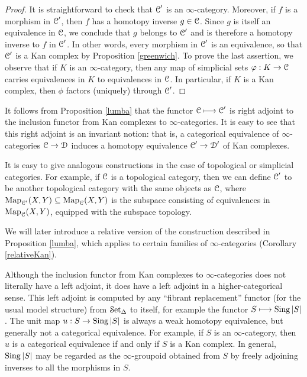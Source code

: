 \begin{Didn't Read}
\begin{proof}
It is straightforward to check that $\operatorname{\mathcal{C}}'$ is an $\infty$-category. Moreover, if
$f$ is a morphism in $\operatorname{\mathcal{C}}'$, then $f$ has a homotopy inverse $g \in \operatorname{\mathcal{C}}$. Since
$g$ is itself an equivalence in $\operatorname{\mathcal{C}}$, we conclude that $g$ belongs to $\operatorname{\mathcal{C}}'$ and
is therefore a homotopy inverse to $f$ in $\operatorname{\mathcal{C}}'$. In other words, every morphism in $\operatorname{\mathcal{C}}'$ is an equivalence, so that $\operatorname{\mathcal{C}}'$ is a Kan complex by Proposition \ref{greenwich}. To prove the last assertion, we observe that if $K$ is an $\infty$-category, then any map of simplicial sets
$\varphi: K \rightarrow \operatorname{\mathcal{C}}$ carries equivalences in $K$ to equivalences in $\operatorname{\mathcal{C}}$. In particular, if
$K$ is a Kan complex, then $\phi$ factors (uniquely) through $\operatorname{\mathcal{C}}'$.
\end{proof}

It follows from Proposition \ref{lumba} that the functor
$\operatorname{\mathcal{C}} \longmapsto \operatorname{\mathcal{C}}'$ is right adjoint to
the inclusion functor from Kan complexes to $\infty$-categories. It is easy to see that this right adjoint is an invariant notion: that is, a categorical equivalence of $\infty$-categories $\operatorname{\mathcal{C}} \rightarrow \operatorname{\mathcal{D}}$ induces a homotopy equivalence
$\operatorname{\mathcal{C}}' \rightarrow \operatorname{\mathcal{D}}'$ of Kan complexes. 

\begin{remark}
It is easy to give analogous constructions in the case of topological or simplicial categories. For example, if $\operatorname{\mathcal{C}}$ is a topological category, then we can define $\operatorname{\mathcal{C}}'$ to be another topological category with the same objects as $\operatorname{\mathcal{C}}$, where $\operatorname{{Map}}_{\operatorname{\mathcal{C}}'}(X,Y) \subseteq \operatorname{{Map}}_{\operatorname{\mathcal{C}}}(X,Y)$ is the subspace consisting of equivalences in $\operatorname{{Map}}_{\operatorname{\mathcal{C}}}(X,Y)$, equipped with the subspace topology.
\end{remark}

\begin{remark}
We will later introduce a relative version of the construction described in Proposition \ref{lumba}, which applies to certain families of $\infty$-categories (Corollary \ref{relativeKan}).
\end{remark}

Although the inclusion functor from Kan complexes to $\infty$-categories does not
literally have a left adjoint, it does have a left adjoint in a higher-categorical sense. This left adjoint is computed by any ``fibrant replacement'' functor (for the usual model structure) from $\operatorname{\mathcal{S}et_{\Delta}}$ to itself, for
example the functor $S \longmapsto \operatorname{Sing} |S|$.
The unit map $u: S \rightarrow
\operatorname{Sing} |S|$ is always a weak homotopy equivalence, but generally not a categorical equivalence. For example, if $S$ is an $\infty$-category, then $u$ is a categorical equivalence if and only if $S$ is a Kan complex. In general, $\operatorname{Sing} |S|$ may be regarded as the $\infty$-groupoid
obtained from $S$ by freely adjoining inverses to all the
morphisms in $S$.


\end{Didn't Read}
